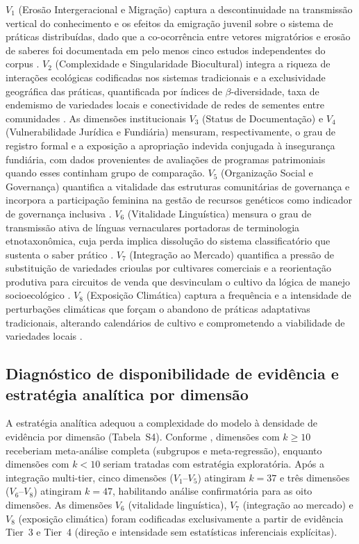 \documentclass[12pt,a4paper]{article}
\begin{document}
$V_1$ (Erosão Intergeracional e Migração) captura a descontinuidade na transmissão vertical do conhecimento \citep{ReyesGarcia2013,GomezBaggethun2013} e os efeitos da emigração juvenil sobre o sistema de práticas distribuídas, dado que a co-ocorrência entre vetores migratórios e erosão de saberes foi documentada em pelo menos cinco estudos independentes do corpus \citep{Tran2025,Moller2023,Bastos2022,VazquezDelfin2022,Aniah2019}. $V_2$ (Complexidade e Singularidade Biocultural) integra a riqueza de interações ecológicas codificadas nos sistemas tradicionais \citep{Jarvis2008,Brush2004} e a exclusividade geográfica das práticas, quantificada por índices de $\beta$-diversidade, taxa de endemismo de variedades locais e conectividade de redes de sementes entre comunidades \citep{Sibanda2025}. As dimensões institucionais $V_3$ (Status de Documentação) e $V_4$ (Vulnerabilidade Jurídica e Fundiária) mensuram, respectivamente, o grau de registro formal e a exposição a apropriação indevida conjugada à insegurança fundiária, com dados provenientes de avaliações de programas patrimoniais quando esses continham grupo de comparação. $V_5$ (Organização Social e Governança) quantifica a vitalidade das estruturas comunitárias de governança \citep{Ostrom1990,Pretty2003} e incorpora a participação feminina na gestão de recursos genéticos como indicador de governança inclusiva \citep{Sibanda2025,RomeroSilva2026,MugiNgenga2016}. $V_6$ (Vitalidade Linguística) mensura o grau de transmissão ativa de línguas vernaculares portadoras de terminologia etnotaxonômica, cuja perda implica dissolução do sistema classificatório que sustenta o saber prático \citep{CamaraLeret2021,LewisSiomns2010}. $V_7$ (Integração ao Mercado) quantifica a pressão de substituição de variedades crioulas por cultivares comerciais e a reorientação produtiva para circuitos de venda que desvinculam o cultivo da lógica de manejo socioecológico \citep{Godoy2005,ReyesGarcia2013}. $V_8$ (Exposição Climática) captura a frequência e a intensidade de perturbações climáticas que forçam o abandono de práticas adaptativas tradicionais, alterando calendários de cultivo e comprometendo a viabilidade de variedades locais \citep{Savo2016,Aniah2019}.

\subsection{Diagnóstico de disponibilidade de evidência e estratégia analítica por dimensão}
\label{sec:diagnosis}

A estratégia analítica adequou a complexidade do modelo à densidade de evidência por dimensão (Tabela~S4). Conforme \citet{Borenstein2009}, dimensões com $k \geq 10$ receberiam meta-análise completa (subgrupos e meta-regressão), enquanto dimensões com $k < 10$ seriam tratadas com estratégia exploratória. Após a integração multi-tier, cinco dimensões ($V_1$--$V_5$) atingiram $k = 37$ e três dimensões ($V_6$--$V_8$) atingiram $k = 47$, habilitando análise confirmatória para as oito dimensões. As dimensões $V_6$ (vitalidade linguística), $V_7$ (integração ao mercado) e $V_8$ (exposição climática) foram codificadas exclusivamente a partir de evidência Tier~3 e Tier~4 (direção e intensidade sem estatísticas inferenciais explícitas).
\end{document}
